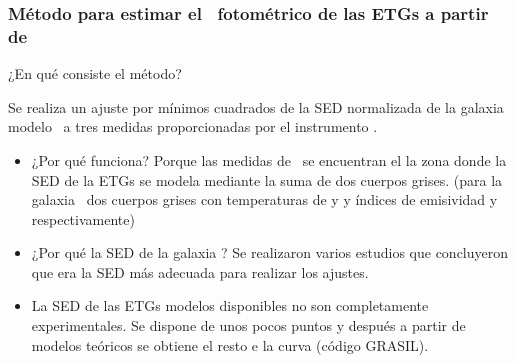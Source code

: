 \documentclass[8pt]{beamer}
\begin{document}
\begin{frame}

\frametitle{Método para estimar el \rt\ fotométrico de las ETGs a partir de \spire}

¿En qué consiste el método?

Se realiza un ajuste por mínimos cuadrados de la SED normalizada de la galaxia modelo \smm\ a tres medidas proporcionadas por el instrumento \spire.

\begin{itemize}

\item ¿Por qué funciona?
Porque las medidas de \spire\ se encuentran el la zona donde la SED de la ETGs se modela mediante la suma de dos cuerpos grises. (para la galaxia \smm\ dos cuerpos grises con temperaturas de  y  y índices de emisividad  y  respectivamente)


\item ¿Por qué la SED de la galaxia \smm? Se realizaron varios estudios que concluyeron que era la SED más adecuada para realizar los ajustes.

\item La SED de las ETGs modelos disponibles no son completamente experimentales. Se dispone de unos pocos puntos y después a partir de modelos teóricos se obtiene el resto e la curva (código GRASIL).

\end{itemize} 

\end{frame}
\end{document}
